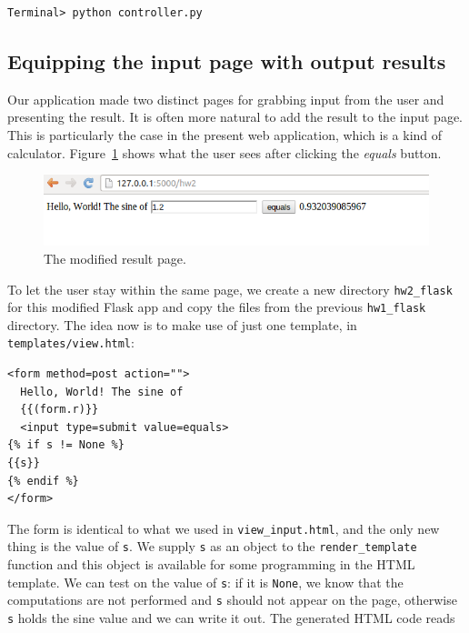 \documentclass[%
oneside,                 %
final,                   %
10pt]{article}
\begin{document}
\begin{Verbatim}[numbers=none,fontsize=\fontsize{9pt}{9pt},baselinestretch=0.85]
Terminal> python controller.py
\end{Verbatim}

\subsection{Equipping the input page with output results}



Our application made two distinct pages for grabbing input from the
user and presenting the result. It is often more natural to add
the result to the input page. This is particularly the case in the present
web application, which is a kind of calculator. Figure~\ref{wf:hw2:flask:fig:result} shows what the user sees after clicking the \emph{equals} button.


\begin{figure}[ht]
  \centerline{\includegraphics[width=0.9\linewidth]{fig-web4sa/hw2_flask_output.png}}
  \caption{
  The modified result page. \label{wf:hw2:flask:fig:result}
  }
\end{figure}


To let the user stay within the same page, we create a new directory \Verb!hw2_flask!
for this modified Flask app and copy the files from the previous
\Verb!hw1_flask! directory.  The idea now is to make use of just one
template, in \Verb!templates/view.html!:

\begin{Verbatim}[numbers=none,fontsize=\fontsize{9pt}{9pt},baselinestretch=0.85]
<form method=post action="">
  Hello, World! The sine of
  {{(form.r)}}
  <input type=submit value=equals>
{% if s != None %}
{{s}}
{% endif %}
</form>
\end{Verbatim}

The form is identical to what we used in \Verb!view_input.html!, and the only
new thing is the value of \Verb!s!. We supply \Verb!s! as an object to the
\Verb!render_template! function and this object is available for
some programming in the HTML template. We can test on the value of \Verb!s!:
if it is \Verb!None!, we know that the computations are not performed and
\Verb!s! should not appear on the page, otherwise \Verb!s! holds the sine
value and we can write it out. The generated HTML code reads
\end{document}
